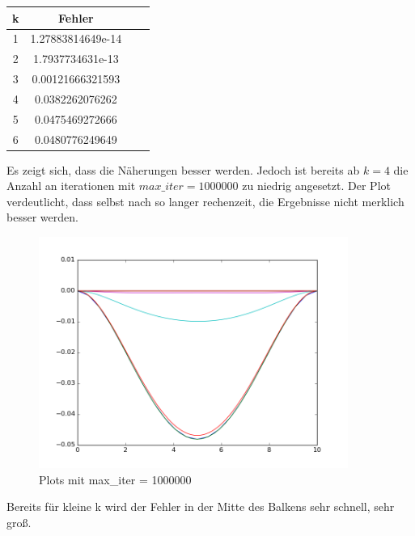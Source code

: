 \documentclass[12pt,titlepage]{article}
\begin{document}
			\begin{table}[H]
				\centering
				\begin{tabular}{c c c c}
					\bf k & \bf Fehler\\
					\hline
					1	& 1.27883814649e-14 \\ 
					2   & 1.7937734631e-13 \\
					3	& 0.00121666321593 \\
					4	& 0.0382262076262\\
					5   & 0.0475469272666\\
					6	& 0.0480776249649\\
				\end{tabular}
			\end{table}
			\newpage
			Es zeigt sich, dass die Näherungen besser werden. Jedoch ist bereits ab $k=4$ die Anzahl an iterationen mit $max\_iter=1000000$ zu niedrig angesetzt. Der Plot verdeutlicht, dass selbst nach so langer rechenzeit, die Ergebnisse nicht merklich besser werden.	 		
		 	\begin{figure}[H] 
	 			\centering
	 			\includegraphics[width=0.9\textwidth]{one_mill.png}
	 			\caption{Plots mit max\_iter = 1000000}
	 			\label{fig:Bild3}
	 		\end{figure}
	 		
	 		Bereits für kleine k wird der Fehler in der Mitte des Balkens sehr schnell, sehr groß.
	 		
\end{document}
